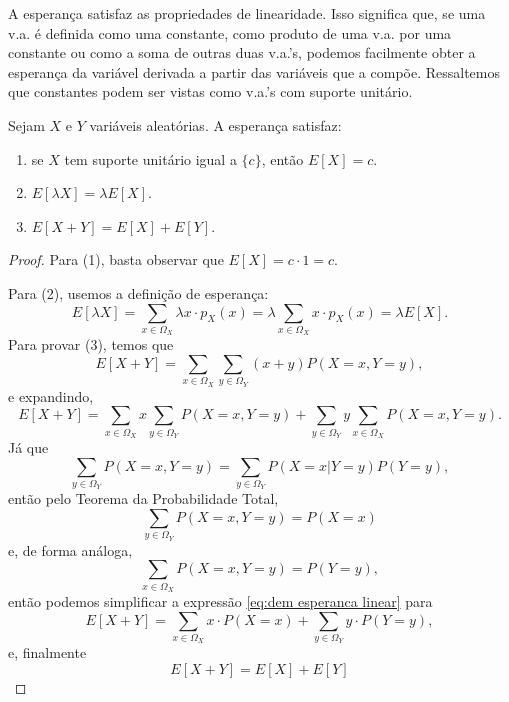 A esperança satisfaz as propriedades de linearidade. Isso significa que, se uma v.a.
é definida como uma constante, como produto de uma v.a. por uma constante ou como a soma de
outras duas v.a.'s, podemos facilmente obter a esperança da variável derivada a partir das
variáveis que a compõe. Ressaltemos que constantes podem ser vistas como v.a.'s com
suporte unitário.

\begin{prop:linearidade da esperanca discreta}
Sejam $X$ e $Y$ variáveis aleatórias. A esperança satisfaz:
\begin{enumerate}
	\item se $X$ tem suporte unitário igual a $\{c\}$, então $E[X] = c$.
	\item $E[\lambda X] = \lambda E[X]$.
	\item $E[X + Y] = E[X] + E[Y]$.
\end{enumerate}
\begin{proof}
	Para (1), basta observar que $E[X] = c \cdot 1 = c$.

	Para (2),  usemos a definição
	de esperança:
	\[
		E[\lambda X] = \sum_{x \in \Omega_X} \lambda x \cdot  p_X(x)
		= \lambda \sum_{x \in \Omega_X} x \cdot p_X(x)
		= \lambda E[X].
	\]
	Para provar (3), temos que
	\[
		E[X + Y] = \sum_{x \in \Omega_X} \sum_{y \in \Omega_Y} (x+y) P(X = x, Y = y),
	\]
	e expandindo,
	\begin{equation}
		\label{eq:dem esperanca linear}
		E[X + Y] =
		\sum_{x \in \Omega_X} x \sum_{y \in \Omega_Y} P(X = x, Y = y) +
		\sum_{y \in \Omega_Y} y \sum_{x \in \Omega_X} P(X = x, Y = y) .
	\end{equation}
	Já que
	\[
		\sum_{y \in \Omega_Y} P(X = x, Y = y) = \sum_{y \in \Omega_Y} P(X = x | Y = y) P(Y = y),
	\]
	então pelo Teorema da Probabilidade Total,
	\[
		\sum_{y \in \Omega_Y} P(X = x, Y = y) = P(X = x)
	\]
	e, de forma análoga,
	\[
		\sum_{x \in \Omega_X} P(X = x, Y = y) = P(Y = y),
	\]
	então podemos simplificar a expressão \ref{eq:dem esperanca linear} para
	\[
		E[X + Y] = \sum_{x \in \Omega_X} x \cdot P(X = x) + \sum_{y \in \Omega_Y} y \cdot P(Y=y),
	\]
	e, finalmente
	\[
		E[X + Y] = E[X] + E[Y]
	\]
\end{proof}
\end{prop:linearidade da esperanca discreta}
